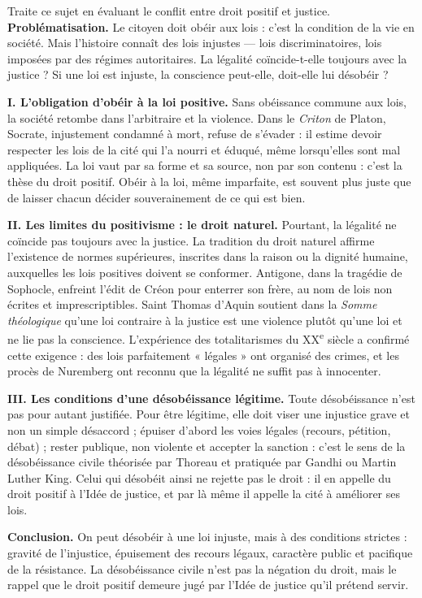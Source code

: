 \documentclass[11pt]{article}
\newcommand{\cle}[1]{{\popxbold\color{popdark}#1}}
\begin{document}
\begin{exoresolu}
Traite ce sujet en évaluant le conflit entre droit positif et justice.
\tcblower
\textbf{Problématisation.} Le citoyen doit obéir aux lois : c'est la condition de la vie en société. Mais l'histoire connaît des lois injustes — lois discriminatoires, lois imposées par des régimes autoritaires. La légalité coïncide-t-elle toujours avec la justice ? Si une loi est injuste, la conscience peut-elle, doit-elle lui désobéir ?

\textbf{I. L'obligation d'obéir à la loi positive.} Sans obéissance commune aux lois, la société retombe dans l'arbitraire et la violence. Dans le \emph{Criton} de Platon, Socrate, injustement condamné à mort, refuse de s'évader : il estime devoir respecter les lois de la cité qui l'a nourri et éduqué, même lorsqu'elles sont mal appliquées. La loi vaut par sa forme et sa source, non par son contenu : c'est la thèse du \cle{droit positif}. Obéir à la loi, même imparfaite, est souvent plus juste que de laisser chacun décider souverainement de ce qui est bien.

\textbf{II. Les limites du positivisme : le droit naturel.} Pourtant, la légalité ne coïncide pas toujours avec la justice. La tradition du \cle{droit naturel} affirme l'existence de normes supérieures, inscrites dans la raison ou la dignité humaine, auxquelles les lois positives doivent se conformer. Antigone, dans la tragédie de Sophocle, enfreint l'édit de Créon pour enterrer son frère, au nom de lois non écrites et imprescriptibles. Saint Thomas d'Aquin soutient dans la \emph{Somme théologique} qu'une loi contraire à la justice est une violence plutôt qu'une loi et ne lie pas la conscience. L'expérience des totalitarismes du XX\textsuperscript{e} siècle a confirmé cette exigence : des lois parfaitement « légales » ont organisé des crimes, et les procès de Nuremberg ont reconnu que la légalité ne suffit pas à innocenter.

\textbf{III. Les conditions d'une désobéissance légitime.} Toute désobéissance n'est pas pour autant justifiée. Pour être légitime, elle doit viser une injustice grave et non un simple désaccord ; épuiser d'abord les voies légales (recours, pétition, débat) ; rester publique, non violente et accepter la sanction : c'est le sens de la \cle{désobéissance civile} théorisée par Thoreau et pratiquée par Gandhi ou Martin Luther King. Celui qui désobéit ainsi ne rejette pas le droit : il en appelle du droit positif à l'Idée de justice, et par là même il appelle la cité à améliorer ses lois.

\textbf{Conclusion.} On peut désobéir à une loi injuste, mais à des conditions strictes : gravité de l'injustice, épuisement des recours légaux, caractère public et pacifique de la résistance. La désobéissance civile n'est pas la négation du droit, mais le rappel que le droit positif demeure jugé par l'Idée de justice qu'il prétend servir.
\end{exoresolu}
\end{document}
